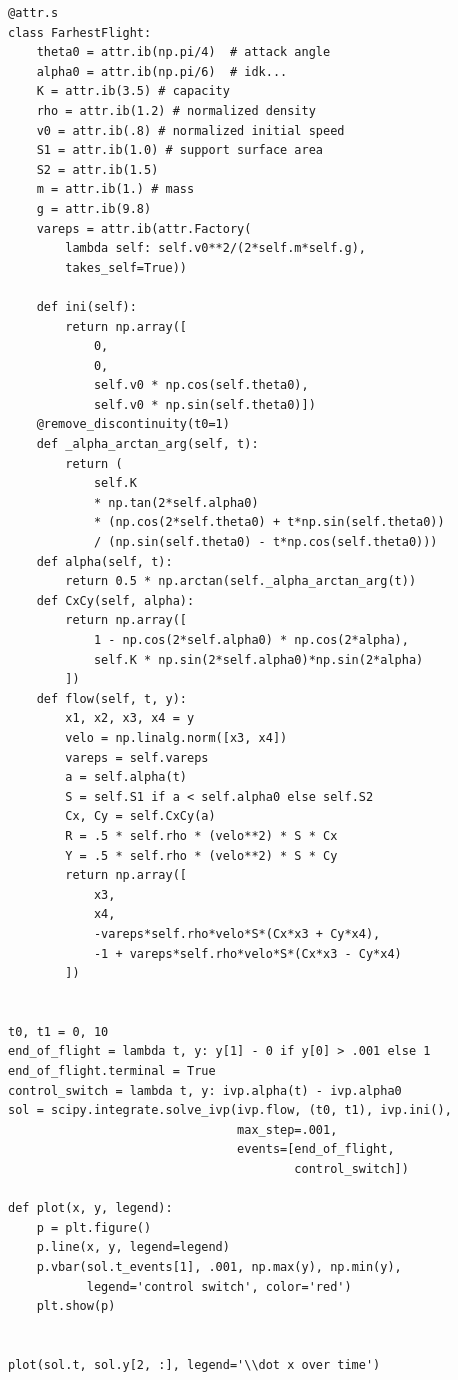\documentclass{article}
\begin{document}
\begin{verbatim}
@attr.s
class FarhestFlight:
    theta0 = attr.ib(np.pi/4)  # attack angle
    alpha0 = attr.ib(np.pi/6)  # idk...
    K = attr.ib(3.5) # capacity
    rho = attr.ib(1.2) # normalized density
    v0 = attr.ib(.8) # normalized initial speed
    S1 = attr.ib(1.0) # support surface area
    S2 = attr.ib(1.5)
    m = attr.ib(1.) # mass
    g = attr.ib(9.8)
    vareps = attr.ib(attr.Factory(
        lambda self: self.v0**2/(2*self.m*self.g),
        takes_self=True))
    
    def ini(self):
        return np.array([
            0,
            0,
            self.v0 * np.cos(self.theta0),
            self.v0 * np.sin(self.theta0)])
    @remove_discontinuity(t0=1)
    def _alpha_arctan_arg(self, t):
        return (
            self.K
            * np.tan(2*self.alpha0)
            * (np.cos(2*self.theta0) + t*np.sin(self.theta0))
            / (np.sin(self.theta0) - t*np.cos(self.theta0)))
    def alpha(self, t):
        return 0.5 * np.arctan(self._alpha_arctan_arg(t))
    def CxCy(self, alpha):
        return np.array([
            1 - np.cos(2*self.alpha0) * np.cos(2*alpha),
            self.K * np.sin(2*self.alpha0)*np.sin(2*alpha)
        ])
    def flow(self, t, y):
        x1, x2, x3, x4 = y
        velo = np.linalg.norm([x3, x4])
        vareps = self.vareps
        a = self.alpha(t)
        S = self.S1 if a < self.alpha0 else self.S2
        Cx, Cy = self.CxCy(a)
        R = .5 * self.rho * (velo**2) * S * Cx
        Y = .5 * self.rho * (velo**2) * S * Cy
        return np.array([
            x3,
            x4,
            -vareps*self.rho*velo*S*(Cx*x3 + Cy*x4),
            -1 + vareps*self.rho*velo*S*(Cx*x3 - Cy*x4)
        ])


t0, t1 = 0, 10
end_of_flight = lambda t, y: y[1] - 0 if y[0] > .001 else 1
end_of_flight.terminal = True
control_switch = lambda t, y: ivp.alpha(t) - ivp.alpha0
sol = scipy.integrate.solve_ivp(ivp.flow, (t0, t1), ivp.ini(),
                                max_step=.001,
                                events=[end_of_flight,
                                        control_switch])
                                      
def plot(x, y, legend):
    p = plt.figure()
    p.line(x, y, legend=legend)
    p.vbar(sol.t_events[1], .001, np.max(y), np.min(y),
           legend='control switch', color='red')
    plt.show(p)


plot(sol.t, sol.y[2, :], legend='\\dot x over time')
\end{verbatim}
\end{document}
